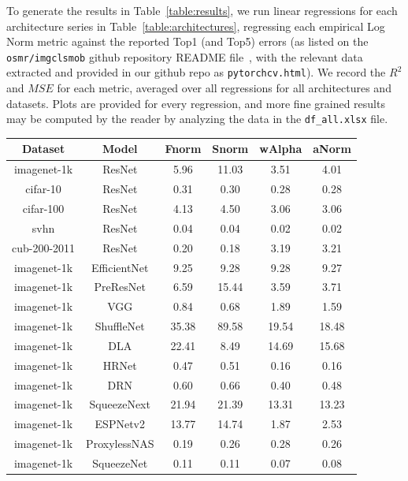 To generate the results in Table~\ref{table:results}, we run linear regressions for each architecture series in Table~\ref{table:architectures}, regressing each empirical Log Norm metric against the reported Top1 (and Top5) errors (as listed on the \texttt{osmr/imgclsmob} github repository README file~\cite{osmr}, with the relevant data extracted and provided in our github repo as \texttt{pytorchcv.html}).
We record the $R^{2}$ and $MSE$ for each metric, averaged over all regressions for all architectures and datasets.
Plots are provided for every regression, and more fine grained results may be computed by the reader by analyzing the data in the \texttt{df\_all.xlsx} file.

 

\begin{table}[t]
\small
\begin{center}
\begin{tabular}{|c|c|c|c|c|c|}
Dataset & Model & Fnorm & Snorm & wAlpha & aNorm \\
\hline
 imagenet-1k & ResNet  & 5.96 &  11.03 & 3.51 & 4.01 \\
 cifar-10 & ResNet  & 0.31 &  0.30 & 0.28 & 0.28 \\
 cifar-100 & ResNet  & 4.13 &  4.50 & 3.06 & 3.06 \\
 svhn & ResNet  & 0.04 &  0.04 & 0.02 & 0.02 \\
 cub-200-2011 & ResNet  & 0.20 &  0.18 & 3.19 & 3.21 \\
 imagenet-1k & EfficientNet  & 9.25 &  9.28 & 9.28 & 9.27 \\
 imagenet-1k & PreResNet  & 6.59 &  15.44 & 3.59 & 3.71 \\
 imagenet-1k & VGG  & 0.84 &  0.68 & 1.89 & 1.59 \\
 imagenet-1k & ShuffleNet  & 35.38 &  89.58 & 19.54 & 18.48 \\
 imagenet-1k & DLA  & 22.41 &  8.49 & 14.69 & 15.68 \\
 imagenet-1k & HRNet  & 0.47 &  0.51 & 0.16 & 0.16 \\
 imagenet-1k & DRN  & 0.60 &  0.66 & 0.40 & 0.48 \\
 imagenet-1k & SqueezeNext  & 21.94 &  21.39 & 13.31 & 13.23 \\
 imagenet-1k & ESPNetv2  & 13.77 &  14.74 & 1.87 & 2.53 \\
 imagenet-1k & ProxylessNAS  & 0.19 &  0.26 & 0.28 & 0.26 \\
 imagenet-1k & SqueezeNet  & 0.11 &  0.11 & 0.07 & 0.08 \\

\end{tabular}
\end{center}
\end{table}
